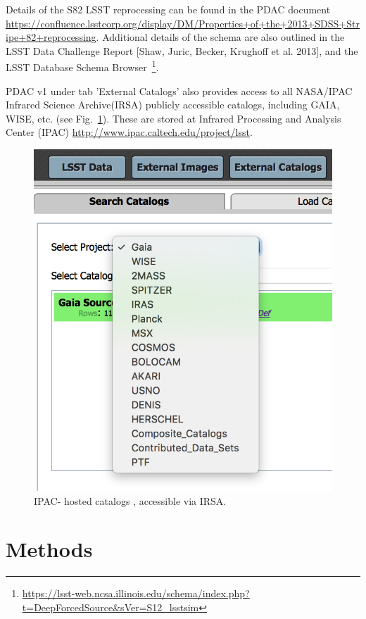 \documentclass[fleqn,usenatbib]{mnras} %
\begin{document}
Details of  the S82 LSST reprocessing can be found in the PDAC document \url{https://confluence.lsstcorp.org/display/DM/Properties+of+the+2013+SDSS+Stripe+82+reprocessing}. Additional details of the schema are also outlined in the LSST Data Challenge Report [Shaw, Juric, Becker, Krughoff et al. 2013], and the LSST Database Schema Browser~\footnote{\url{https://lsst-web.ncsa.illinois.edu/schema/index.php?t=DeepForcedSource&sVer=S12_lsstsim}}. 

PDAC v1 under tab 'External Catalogs' also provides access to  all NASA/IPAC Infrared Science Archive(IRSA) publicly accessible catalogs, including GAIA, WISE, etc. (see Fig.~\ref{fig:PDAC_external_cat}). These are stored at Infrared Processing and Analysis Center (IPAC) \url{http://www.ipac.caltech.edu/project/lsst}.


\begin{figure}
\includegraphics[width=\columnwidth]{2_PDAC_externals}
\caption{IPAC- hosted catalogs , accessible via IRSA. }
\label{fig:PDAC_external_cat}
\end{figure}


\section{Methods}
\end{document}
